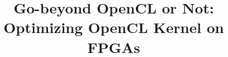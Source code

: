 \documentclass[sigconf, 9pt]{acmart}
\begin{document}
	
\title{Go-beyond OpenCL or Not: Optimizing OpenCL Kernel on FPGAs}



\maketitle

\vspace{-1ex}

\vspace{-1ex}

\vspace{-1ex}

\vspace{-1ex}

\vspace{-1ex}

\vspace{-1ex}




\end{document}
